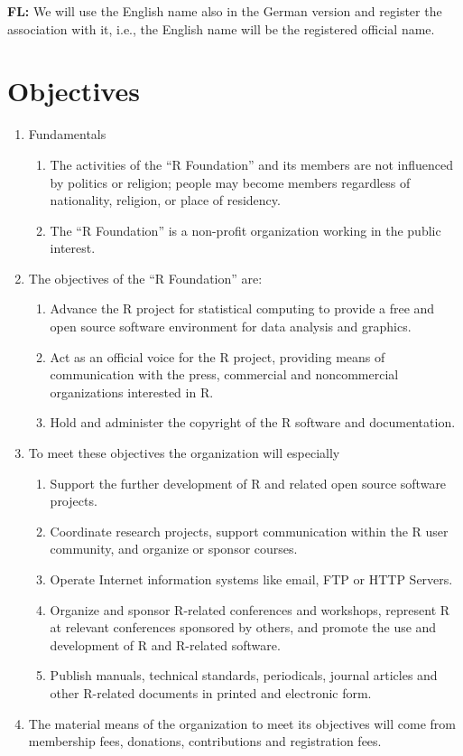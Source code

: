 \documentclass[a4paper]{article}
\newcommand{\note}[2]{{\it \par\noindent\textbf{#1:} #2}}
\begin{document}
\note{FL}{We will use the English name also in the German version and
  register the association with it, i.e., the English name will be the
  registered official name.}

\section{Objectives}

\begin{enumerate}
 \item Fundamentals
  \begin{enumerate}
   \item The activities of the ``R Foundation'' and its members are not
    influenced by politics or religion; people may become members
    regardless of nationality, religion, or place of residency.
   \item The ``R Foundation'' is a non-profit organization working in
    the public interest.
  \end{enumerate}
 \item The objectives of the ``R Foundation'' are:
  \begin{enumerate}
   \item Advance the R project for statistical computing to provide a
    free and open source software environment for data analysis and
    graphics. 
   \item Act as an official voice for the R project, providing means of
    communication with the press, commercial and noncommercial
    organizations interested in R.
   \item Hold and administer the copyright of the R software and
    documentation.
  \end{enumerate}

 \item To meet these objectives the organization will especially
  \begin{enumerate}
   \item Support the further development of R and related open source
    software projects.
   \item Coordinate research projects, support communication within
    the R user community, and organize or sponsor courses.
   \item Operate Internet information systems like email, FTP or HTTP
    Servers.
   \item Organize and sponsor R-related conferences and workshops,
    represent R at relevant conferences sponsored by others, and
    promote the use and development of R and R-related software.
   \item Publish manuals, technical standards, periodicals, journal
    articles and other R-related documents in printed and electronic
    form.
  \end{enumerate}

 \item The material means of the organization to meet its objectives will
  come from membership fees, donations, contributions and registration
  fees. 
  
\end{enumerate}
\end{document}
